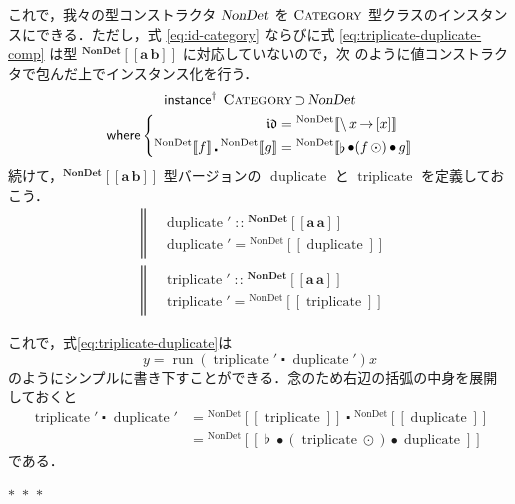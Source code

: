 \documentclass[a5paper,twoside,fleqn,draft]{jsbook}
\def\[{[\![}
\def\]{]\!]}
\newcommand{\separator}{\begin{center}$*$~$*$~$*$\end{center}}
\newcommand{\mBrace}{\Vert}
\newcommand{\mKeyword}[1]{\mathsf{#1}}
\newcommand{\mInstanceDeclKeyword}{\mKeyword{instance}}
\newcommand{\mWhereKeyword}{\mKeyword{where}}
\DeclareMathOperator{\mInstanceDeclPolymorphic}{\mInstanceDeclKeyword^{\dagger}}
\DeclareMathOperator{\mSuperSet}{\supset}
\DeclareMathOperator{\mWhere}{\mWhereKeyword}
\newcommand{\mSpecialFunc}[1]{#1}
\newcommand{\mVarSpecialFunc}[1]{\mathfrak{#1}}
\DeclareMathOperator{\mDuplicate}{\mSpecialFunc{duplicate}}
\DeclareMathOperator{\mIdCat}{\mVarSpecialFunc{id}}
\DeclareMathOperator{\mRun}{\mSpecialFunc{run}}
\DeclareMathOperator{\mTriplicate}{\mSpecialFunc{triplicate}}
\DeclareMathOperator{\mComp}{\bullet}
\DeclareMathOperator{\mCompCat}{\centerdot}
\DeclareMathOperator{\mIn}{{:\!:}}
\DeclareMathOperator{\mJoinList}{\flat} %
\DeclareMathOperator{\mLambda}{\backslash}
\DeclareMathOperator{\mLambdaArrow}{\rightarrow}
\DeclareMathOperator{\mMapList}{\odot}
\newcommand{\mType}[1]{\mathbf{#1}} %
\newcommand{\mA}{\mType{a}}
\newcommand{\mB}{\mType{b}}
\newcommand{\mTypeAssemble}[2]{{}^{\mType{#1}}\[\mType{#2}\]}
\newcommand{\mTypeConstructor}[1]{\textsl{#1}}
\newcommand{\mValueConstructor}[1]{\mathrm{#1}}
\newcommand{\mValueWith}[2]{{}^\mValueConstructor{#1}\[#2\]}
\newcommand{\mTypeClass}[1]{\textsc{#1}} %
\newcommand{\mCategoryTypeClass}{\mTypeClass{Category}}
\newcommand{\mLambdaEXP}[2]{\mLambda{#1}\mLambdaArrow{#2}} %
\begin{document}
これで，我々の型コンストラクタ $\mTypeConstructor{NonDet}$ を
$\mCategoryTypeClass$ 型クラスのインスタンスにできる．ただし，式
\eqref{eq:id-category} ならびに式 \eqref{eq:triplicate-duplicate-comp}
は型 $\mTypeAssemble{NonDet}{\mA\,\mB}$ に対応していないので，次
のように値コンストラクタで包んだ上でインスタンス化を行う．
\begin{multline}
  \label{eq:nondet-instance}
  \mInstanceDeclPolymorphic\;
  \mTypeClass{Category}\mSuperSet\mTypeConstructor{NonDet}\\
  \mWhere\left\{
  \begin{aligned}
    \mIdCat
    &=\mValueWith{NonDet}{\mLambdaEXP{x}{[x]}}\\
    \mValueWith{NonDet}{f}\mCompCat\mValueWith{NonDet}{g}
    &=\mValueWith{NonDet}{\mJoinList\mComp(f\mMapList)\mComp g}
  \end{aligned}
  \right.
\end{multline}
続けて，$\mTypeAssemble{NonDet}{\mA\,\mB}$ 型バージョンの
$\mDuplicate$ と $\mTriplicate$ を定義しておこう．
\begin{align}
  &\left\mBrace
  \begin{aligned}
    &\mDuplicate'
    \mIn\mTypeAssemble{NonDet}{\mA\,\mA}\\
    &\mDuplicate'
    =\mValueWith{NonDet}{\mDuplicate}
  \end{aligned}
  \right.\\
  &\left\mBrace
  \begin{aligned}
    &\mTriplicate'
    \mIn\mTypeAssemble{NonDet}{\mA\,\mA}\\
    &\mTriplicate'
    =\mValueWith{NonDet}{\mTriplicate}
  \end{aligned}
  \right.
\end{align}

これで，式\eqref{eq:triplicate-duplicate}は
\begin{equation}
  y=\mRun(\mTriplicate'\mCompCat\mDuplicate')x
\end{equation}
のようにシンプルに書き下すことができる．念のため右辺の括弧の中身を展開
しておくと
\begin{align}
  \mTriplicate'\mCompCat\mDuplicate'
  &=\mValueWith{NonDet}{\mTriplicate}\mCompCat\mValueWith{NonDet}{\mDuplicate}\\
  &=\mValueWith{NonDet}{\mJoinList\mComp(\mTriplicate\mMapList)\mComp\mDuplicate}
\end{align}
である．

\separator
\end{document}
